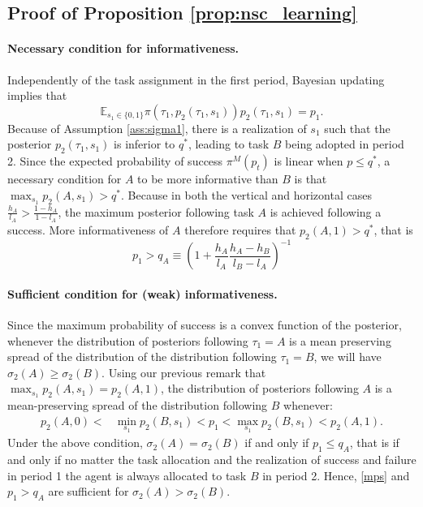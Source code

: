 \documentclass[12pt,american]{paper}
\theoremstyle{remark}
\begin{document}

\subsection*{Proof of Proposition \ref{prop:nsc_learning}}


\paragraph{Necessary condition for informativeness.}  Independently of the task assignment in the first period, Bayesian updating implies that 
\begin{equation}\label{mean}
\mathbb E_{s_1\in\{0,1\}}\pi (\tau_1,p_2(\tau_1,s_1)) p_2(\tau_1,s_1)=p_1.
\end{equation}
Because of Assumption \ref{ass:sigma1}, there is a realization of $s_1$ such that the posterior $p_2(\tau_1,s_1)$ is inferior to $q^*$, leading to  task $B$ being adopted in period 2. Since the expected probability of success $\pi^M(p_t)$ is linear when $p\leq q^*$, a necessary condition for $A$ to be more informative than $B$ is that $\max_{s_1}p_2(A,s_1)>q^*$.  Because in both the vertical and horizontal cases $\frac{h_A}{l_A}>\frac{1-h_A}{1-l_A}$, the maximum posterior following task $A$ is achieved following a success. More informativeness of $A$ therefore requires that $p_2(A,1)>q^*$, that is
\begin{equation}\label{q}
p_1 > q_A\equiv  \left(1+\frac{h_A}{l_A}\frac{h_A-h_B}{l_B-l_A}\right)^{-1}
\end{equation}
%
\paragraph{Sufficient condition for (weak) informativeness.} %

Since the maximum probability of success is a convex function of the posterior, whenever the distribution of posteriors following $\tau_1=A$ is a mean preserving spread of the distribution of the distribution following $\tau_1=B$, we will have $\sigma_2(A)\geq \sigma_2(B)$. Using our previous remark that $\max_{s_1}p_2(A,s_1)=p_2(A,1)$, the distribution of posteriors following $A$ is a mean-preserving spread of the distribution following $B$ whenever:
\begin{align}\label{mps}
p_2(A,0) < &\min_{s_1}p_2(B,s_1)<p_1<\max_{s_1}p_2(B,s_1) < p_2(A,1). \tag{MPS}
\end{align}
Under the above condition, $\sigma_2(A) = \sigma_2(B)$ if and only if $p_1\leq q_A$, that is if and only if no matter the task allocation and the realization of success and failure in period 1 the agent is always allocated to task $B$ in period 2. Hence, \eqref{mps} and $p_1> q_A$ are sufficient for  $\sigma_2(A) > \sigma_2(B)$.
\end{document}
